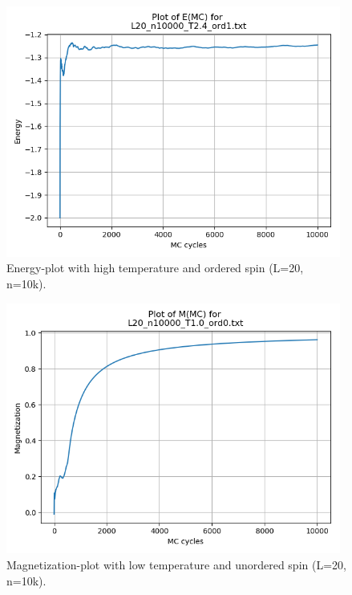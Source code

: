 \documentclass{article}
\begin{document}
    \begin{figure}[ht]
      \centering
      \includegraphics[width = 11cm]{img/energy_L20_n10000_T24_ord1.png}
      \caption{Energy-plot with high temperature and ordered spin (L=20, n=10k).}
      \label{fig:L20-energy-highT-ord1}
    \end{figure}

    \begin{figure}[ht]
      \centering
      \includegraphics[width = 11cm]{img/magnet_L20_n10000_T10_ord0.png}
      \caption{Magnetization-plot with low temperature and unordered spin (L=20, n=10k).}
      \label{fig:L20-magnet-lowT-ord0}
    \end{figure}
\end{document}
